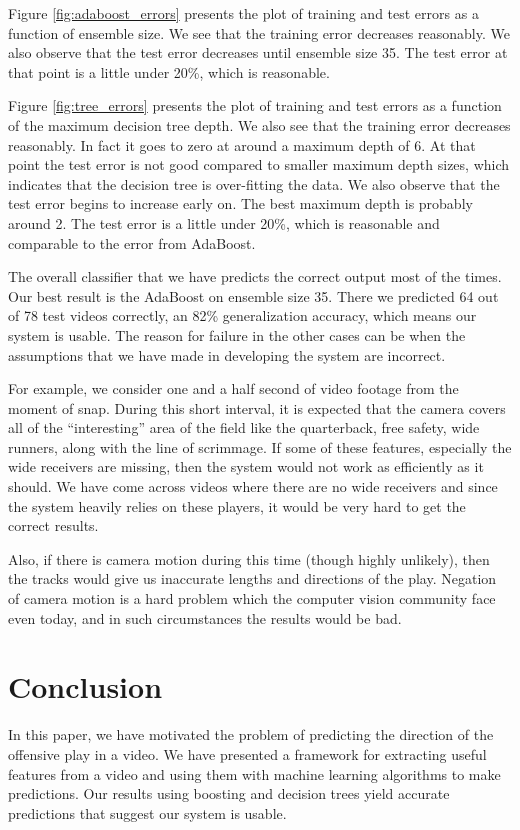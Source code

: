 \documentclass{article} %
\begin{document}
Figure \ref{fig:adaboost_errors} presents the plot of training and test errors as a function of ensemble size. We see that the training error decreases reasonably. We also observe that the test error decreases until ensemble size 35. The test error at that point is a little under 20\%, which is reasonable.

Figure \ref{fig:tree_errors} presents the plot of training and test errors as a function of the maximum decision tree depth. We also see that the training error decreases reasonably. In fact it goes to zero at around a maximum depth of 6. At that point the test error is not good compared to smaller maximum depth sizes, which indicates that the decision tree is over-fitting the data. We also observe that the test error begins to increase early on. The best maximum depth is probably around 2. The test error is a little under 20\%, which is reasonable and comparable to the error from AdaBoost.

The overall classifier that we have predicts the correct output most of the times. Our best result is the AdaBoost on ensemble size 35. There we predicted 64 out of 78 test videos correctly, an 82\% generalization accuracy, which means our system is usable. The reason for failure in the other cases can be when the assumptions that we have made in developing the system are incorrect.

For example, we consider one and a half second of video footage from the moment of snap. During this short interval, it is expected that the camera covers all of the ``interesting'' area of the field like the quarterback, free safety, wide runners, along with the line of scrimmage. If some of these features, especially the wide receivers are missing, then the system would not work as efficiently as it should. We have come across videos where there are no wide receivers and since the system heavily relies on these players, it would be very hard to get the correct results.

Also, if there is camera motion during this time (though highly unlikely), then the tracks would give us inaccurate lengths and directions of the play. Negation of camera motion is a hard problem which the computer vision community face even today, and in such circumstances the results would be bad.

\section{Conclusion}

In this paper, we have motivated the problem of predicting the direction of the offensive play in a video. We have presented a framework for extracting useful features from a video and using them with machine learning algorithms to make predictions. Our results using boosting and decision trees yield accurate predictions that suggest our system is usable.
\end{document}

